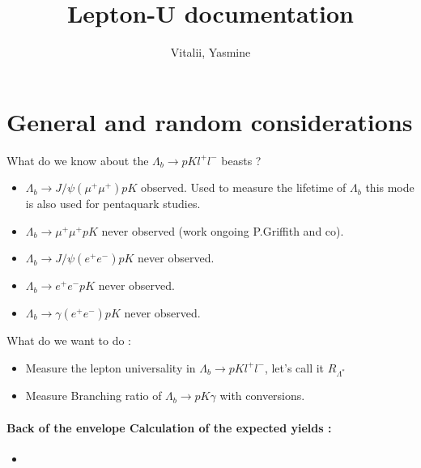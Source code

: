 \documentclass[11pt, oneside]{article}   	%
\title{Lepton-U documentation}
\author{Vitalii, Yasmine}
\begin{document}
\maketitle

\section {General and random considerations}
What do we know about the  $\Lambda_b\to pK l^+l^-$ beasts  ?

\begin{itemize}
\item $\Lambda_b\to J/\psi (\mu^+ \mu^+) pK $ observed. Used to measure the lifetime of $\Lambda_b$ this mode is also used for pentaquark studies.
\item $\Lambda_b\to \mu^+ \mu^+ pK $ never observed (work ongoing P.Griffith and co). 
\item $\Lambda_b\to J/\psi (e ^+e^-) pK $ never observed. 
\item $\Lambda_b\to e ^+e^- pK $ never observed. 
\item $\Lambda_b\to \gamma(e ^+e^-) pK $ never observed. 
\end{itemize}
What do we want to do : 

\begin{itemize}
\item Measure the lepton universality in $\Lambda_b\to pK l^+l^-$, let's call it $R_{\Lambda^*}$
\item Measure Branching ratio of $\Lambda_b \to p K \gamma $ with conversions. 
\end{itemize}

\paragraph {Back of the envelope Calculation of the expected yields :}

\begin{itemize}
\item
\end{itemize}


\end{document}
